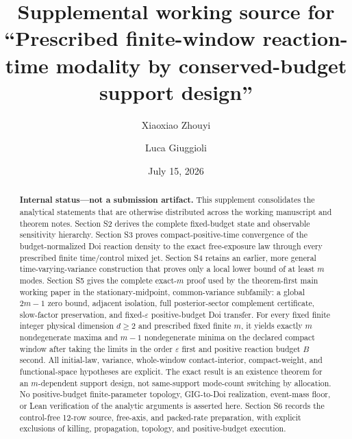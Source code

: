 \documentclass[aps,physrev,onecolumn,amsmath,amssymb,longbibliography]{revtex4-2}
\begin{document}
\title{Supplemental working source for
``Prescribed finite-window reaction-time modality by conserved-budget support design''}

\author{Xiaoxiao Zhouyi}
\author{Luca Giuggioli}

\date{July 15, 2026}

\begin{abstract}
\textbf{Internal status---not a submission artifact.}
This supplement consolidates the analytical statements that are otherwise
distributed across the working manuscript and theorem notes.  Section S2
derives the complete fixed-budget state and observable sensitivity hierarchy.
Section S3 proves compact-positive-time convergence of the budget-normalized
Doi reaction density to the exact free-exposure law through every prescribed
finite time/control mixed jet.  Section S4 retains an earlier, more general
time-varying-variance construction that proves only a local lower bound of at
least \(m\) modes.  Section S5 gives the complete exact-\(m\) proof used by the
theorem-first main working paper in the stationary-midpoint, common-variance
subfamily: a global \(2m-1\) zero bound, adjacent isolation, full
posterior-sector complement certificate, slow-factor preservation, and
fixed-\(\varepsilon\) positive-budget Doi transfer.  For every fixed finite
integer physical dimension \(d\ge2\) and prescribed fixed finite \(m\), it
yields exactly \(m\) nondegenerate maxima and \(m-1\) nondegenerate minima on
the declared compact window after taking the limits in the order
\(\varepsilon\) first and positive reaction budget \(B\) second.  All
initial-law, variance, whole-window contact-interior, compact-weight, and
functional-space hypotheses are explicit.  The exact result is an existence
theorem for an \(m\)-dependent support design, not same-support mode-count
switching by allocation.
No positive-budget finite-parameter topology, GIG-to-Doi realization,
event-mass floor, or Lean verification of the analytic arguments is asserted
here.  Section S6 records the control-free 12-row source, free-axis, and
packed-rate preparation, with explicit exclusions of killing, propagation,
topology, and positive-budget execution.
\end{abstract}

\maketitle
\end{document}
